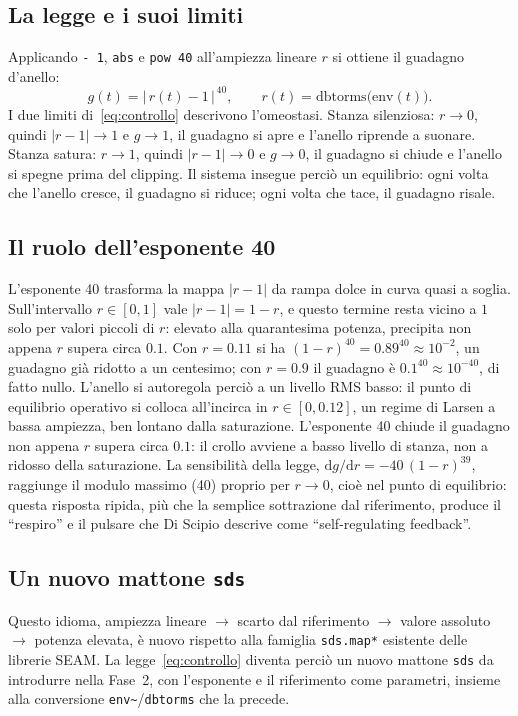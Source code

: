 \documentclass[11pt,a4paper]{article}
\begin{document}
\subsection{La legge e i suoi limiti}
Applicando \texttt{- 1}, \texttt{abs} e \texttt{pow 40} all'ampiezza lineare $r$ si ottiene il guadagno d'anello:
\begin{equation}
g(t) = \big|\, r(t) - 1 \,\big|^{\,40},
\qquad r(t) = \mathrm{dbtorms}\big(\text{env}(t)\big).
\label{eq:controllo}
\end{equation}
I due limiti di~\eqref{eq:controllo} descrivono l'omeostasi.
Stanza silenziosa: $r \to 0$, quindi $|r - 1| \to 1$ e $g \to 1$, il guadagno si apre e l'anello riprende a suonare.
Stanza satura: $r \to 1$, quindi $|r - 1| \to 0$ e $g \to 0$, il guadagno si chiude e l'anello si spegne prima del clipping.
Il sistema insegue perciò un equilibrio: ogni volta che l'anello cresce, il guadagno si riduce; ogni volta che tace, il guadagno risale.

\subsection{Il ruolo dell'esponente 40}
L'esponente \num{40} trasforma la mappa $|r-1|$ da rampa dolce in curva quasi a soglia.
Sull'intervallo $r \in [0,1]$ vale $|r-1| = 1-r$, e questo termine resta vicino a $1$ solo per valori piccoli di $r$: elevato alla quarantesima potenza, precipita non appena $r$ supera circa $0.1$.
Con $r = 0.11$ si ha $(1-r)^{40} = 0.89^{40} \approx 10^{-2}$, un guadagno già ridotto a un centesimo; con $r = 0.9$ il guadagno è $0.1^{40} \approx 10^{-40}$, di fatto nullo.
L'anello si autoregola perciò a un livello RMS basso: il punto di equilibrio operativo si colloca all'incirca in $r \in [0, 0.12]$, un regime di Larsen a bassa ampiezza, ben lontano dalla saturazione.
L'esponente \num{40} chiude il guadagno non appena $r$ supera circa $0.1$: il crollo avviene a basso livello di stanza, non a ridosso della saturazione.
La sensibilità della legge, $\mathrm{d}g/\mathrm{d}r = -40\,(1-r)^{39}$, raggiunge il modulo massimo (\num{40}) proprio per $r \to 0$, cioè nel punto di equilibrio: questa risposta ripida, più che la semplice sottrazione dal riferimento, produce il ``respiro'' e il pulsare che Di Scipio descrive come ``self-regulating feedback''.

\subsection{Un nuovo mattone \texttt{sds}}
Questo idioma, ampiezza lineare $\to$ scarto dal riferimento $\to$ valore assoluto $\to$ potenza elevata, è nuovo rispetto alla famiglia \texttt{sds.map*} esistente delle librerie SEAM.
La legge~\eqref{eq:controllo} diventa perciò un nuovo mattone \texttt{sds} da introdurre nella Fase~2, con l'esponente e il riferimento come parametri, insieme alla conversione \texttt{env\textasciitilde{}}/\texttt{dbtorms} che la precede.
\end{document}
